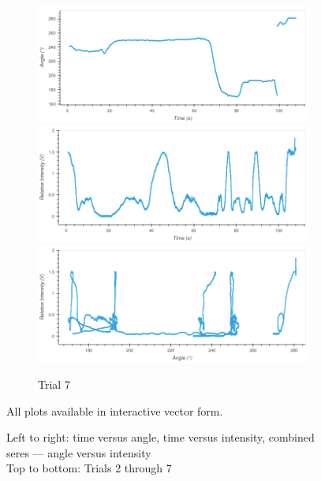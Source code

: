 \begin{figure}
\begin{subfigure}{1.0\textwidth}
\caption{Trial 7}
\includegraphics[width=\plotwidth]{plots/t8-time-angle.png}
\includegraphics[width=\plotwidth]{plots/t8-time-intensity.png}
\includegraphics[width=\plotwidth]{plots/t8-angle-intensity.png}
\end{subfigure}

\caption*{
Left to right: time versus angle, time versus intensity, combined seres — angle versus intensity\\
Top to bottom: Trials 2 through 7
}
All plots available in interactive vector form.
\end{figure}
